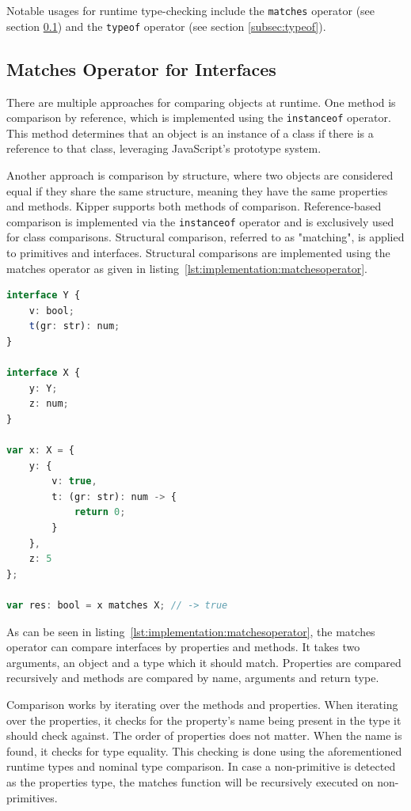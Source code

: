 Notable usages for runtime type-checking include the \lstinline|matches| operator (see section \ref{subsec:matches}) and the \lstinline|typeof| operator (see section \ref{subsec:typeof}).

\subsection{Matches Operator for Interfaces}
\label{subsec:matches}

There are multiple approaches for comparing objects at runtime. One method is comparison by reference, which is implemented using the \lstinline|instanceof| operator. This method determines that an object is an instance of a class if there is a reference to that class, leveraging JavaScript's prototype system.

Another approach is comparison by structure, where two objects are considered equal if they share the same structure, meaning they have the same properties and methods. Kipper supports both methods of comparison. Reference-based comparison is implemented via the \lstinline|instanceof| operator and is exclusively used for class comparisons. Structural comparison, referred to as "matching", is applied to primitives and interfaces. Structural comparisons are implemented using the matches operator as given in listing~\ref{lst:implementation:matchesoperator}.

\begin{lstlisting}[language=Typescript,caption=The Kipper matches operator,label=lst:implementation:matchesoperator]
interface Y {
	v: bool;
	t(gr: str): num;
}

interface X {
	y: Y;
	z: num;
}

var x: X = {
	y: {
		v: true,
		t: (gr: str): num -> {
			return 0;
		}
	},
	z: 5
};

var res: bool = x matches X; // -> true
\end{lstlisting}

As can be seen in listing~\ref{lst:implementation:matchesoperator}, the matches operator can compare interfaces by properties and methods. It takes two arguments, an object and a type which it should match. Properties are compared recursively and methods are compared by name, arguments and return type.

Comparison works by iterating over the methods and properties. When iterating over the properties, it checks for the property's name being present in the type it should check against. The order of properties does not matter. When the name is found, it checks for type equality. This checking is done using the aforementioned runtime types and nominal type comparison. In case a non-primitive is detected as the properties type, the matches function will be recursively executed on non-primitives.

